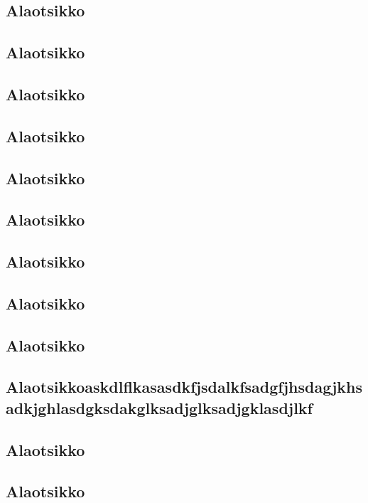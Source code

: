 \documentclass[a4paper]{article}
\begin{document}
\subsection{Alaotsikko}

\subsection{Alaotsikko}
\subsection{Alaotsikko}

\subsection{Alaotsikko}

\subsection{Alaotsikko}
\subsection{Alaotsikko}

\subsection{Alaotsikko}

\subsection{Alaotsikko}
\subsection{Alaotsikko}

\subsection{Alaotsikkoaskdlflkasasdkfjsdalkfsadgfjhsdagjkhsadkjghlasdgksdakglksadjglksadjgklasdjlkf}

\subsection{Alaotsikko}
\subsection{Alaotsikko}
\end{document}
